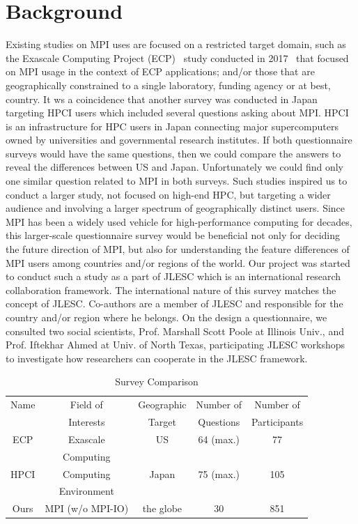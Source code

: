 \documentclass[conference,10pt,letterpaper]{IEEEtran}
\begin{document}
\section{Background}

Existing studies on MPI uses are focused on a restricted target domain,
such as the Exascale Computing Project (ECP)~\cite{ECP} study
conducted in 2017~\cite{osti_1462877} that focused 
on MPI usage in the context of ECP applications; and/or those that are
geographically constrained to a single laboratory, funding agency or
at best, country. It ws a coincidence
that another survey was conducted in Japan targeting HPCI\cite{HPCI}
users which included several questions asking about
MPI\cite{hpci-user-survey}.  HPCI is an infrastructure for HPC users
in Japan connecting major supercomputers owned by universities and
governmental research institutes. If both questionnaire surveys would
have the same questions, then we could compare the answers to reveal
the differences between US and Japan. Unfortunately we could find only
one similar question related to MPI in both surveys.
%
Such studies inspired us to conduct a larger study, not focused on
high-end HPC, but targeting a wider audience and involving a larger
spectrum of geographically distinct users. Since MPI has been a widely
used vehicle for high-performance computing for decades, this
larger-scale questionnaire survey would be beneficial not only for
deciding the future direction of MPI, but also for understanding the
feature differences of MPI users among countries and/or regions of the
world.
%
Our project was started to conduct such a study as a part of
JLESC\cite{JLESC} which is an international research collaboration
framework. The international nature of this survey matches the concept
of JLESC. Co-authors are a member of JLESC and responsible for the
country and/or region where he belongs. On the design a questionnaire,
we consulted two social scientists, Prof. Marshall Scott Poole at
Illinois Univ., and Prof. Iftekhar Ahmed at Univ. of North Texas,
participating JLESC workshops to investigate how researchers can
cooperate in the JLESC framework. 
%
\begin{table}[htb]%
\begin{center}%
\caption{Survey Comparison}\label{tab:comparison}%
\begin{tabular}{c|cccc}%
\hline%
Name & Field of  & Geographic & Number of & Number of \\%
     & Interests & Target     & Questions & Participants \\%
\hline%
\hline%
ECP  & Exascale & US & 64 (max.) & 77 \\%
& Computing & & & \\%
\hline%
HPCI & Computing & Japan & 75 (max.) & 105 \\%
& Environment & & & \\%
\hline%
Ours & MPI (w/o MPI-IO) & the globe & 30 & 851 \\%
\hline%
\end{tabular}%
\end{center}%
\end{table}%
\end{document}
